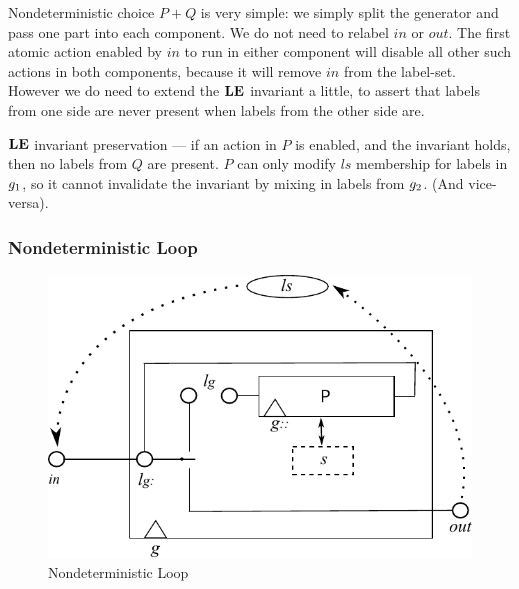 Nondeterministic choice $P+Q$ is very simple:
we simply split the generator and pass one part
into each component. We do not need to relabel $in$
or $out$.
The first atomic action enabled by $in$ to
run in either component will disable all other such actions in both components,
because it will remove $in$ from the label-set.
However we do need to extend the $\mathbf{LE}$ invariant a little,
to assert that labels from one side are never present when labels from
the other side are.


$\mathbf{LE}$ invariant preservation --- if an action in $P$ is enabled,
and the invariant holds, then no labels from $Q$ are present.
$P$ can only modify $ls$ membership for labels in $g_{1}$,
so it cannot invalidate the invariant by mixing in labels from $g_{2}$.
(And vice-versa).


\newpage
\subsubsection{Nondeterministic Loop}

\begin{figure}[h]
  \centering
  \includegraphics{images/kleene-star-actual}
  \caption{Nondeterministic Loop}
  \label{fig:nondet-loop}
\end{figure}

